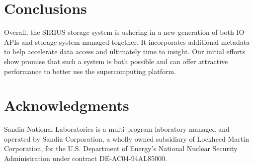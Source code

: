 \documentclass[letterpaper,twocolumn,10pt]{article}
\begin{document}
\section{Conclusions}
\label{sec:conclusion}

Overall, the SIRIUS storage system is ushering in a new generation of both IO
APIs and storage system managed together. It incorporates additional metadata
to help accelerate data access and ultimately time to insight. Our initial
efforts show promise that such a system is both possible and can offer
attractive performance to better use the supercomputing platform.

%
%

\section{Acknowledgments}

Sandia National Laboratories is a multi-program laboratory managed and operated
by Sandia Corporation, a wholly owned subsidiary of Lockheed Martin
Corporation, for the U.S. Department of Energy's National Nuclear Security
Administration under contract DE-AC04-94AL85000.

{\footnotesize 
}

\end{document}

